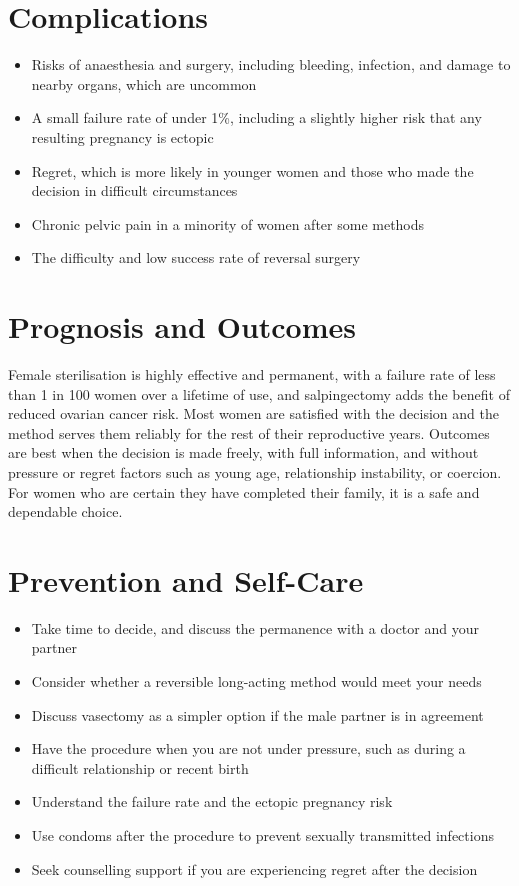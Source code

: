 \section*{Complications}
\begin{itemize}
    \item Risks of anaesthesia and surgery, including bleeding, infection, and damage to nearby organs, which are uncommon
    \item A small failure rate of under 1\%, including a slightly higher risk that any resulting pregnancy is ectopic
    \item Regret, which is more likely in younger women and those who made the decision in difficult circumstances
    \item Chronic pelvic pain in a minority of women after some methods
    \item The difficulty and low success rate of reversal surgery
\end{itemize}

\section*{Prognosis and Outcomes}
Female sterilisation is highly effective and permanent, with a failure rate of less than 1 in 100 women over a lifetime of use, and salpingectomy adds the benefit of reduced ovarian cancer risk. Most women are satisfied with the decision and the method serves them reliably for the rest of their reproductive years. Outcomes are best when the decision is made freely, with full information, and without pressure or regret factors such as young age, relationship instability, or coercion. For women who are certain they have completed their family, it is a safe and dependable choice.

\section*{Prevention and Self-Care}
\begin{itemize}
    \item Take time to decide, and discuss the permanence with a doctor and your partner
    \item Consider whether a reversible long-acting method would meet your needs
    \item Discuss vasectomy as a simpler option if the male partner is in agreement
    \item Have the procedure when you are not under pressure, such as during a difficult relationship or recent birth
    \item Understand the failure rate and the ectopic pregnancy risk
    \item Use condoms after the procedure to prevent sexually transmitted infections
    \item Seek counselling support if you are experiencing regret after the decision
\end{itemize}

